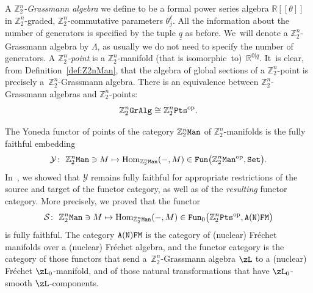 \documentclass[pdftex]{sigma}%
\newcommand{\op}[1]{\operatorname{#1}}
\newcommand{\catname}[1]{\textnormal{\texttt{#1}}}
\newcommand{\R}{{\mathbb R}}
\newcommand{\Z}{{\mathbb Z}}
\def\ul{\underline}
\def\ul{\underline}
\newcommand{\0}{\otimes}
\newcommand{\z}{\Z_2^n}
\numberwithin{equation}{section}
\begin{document}
A \emph{$\Z_2^n$-Grassmann algebra} we define to be a formal power series algebra $\R[[\theta]]$ in $\Z_2^n$-graded, $\Z_2^n$-commutative parameters $\theta_j^\ell$. All the information about the number of generators is specified by the tuple $\ul{q}$ as before. We~will denote a $\Z_2^n$-Grassmann algebra by $\Lambda$, as usually we do not need to specify the number of generators. A \emph{$\Z_2^n$-point} is a $\Z_2^n$-manifold (that is isomor\-phic~to)~$\R^{0|\ul q}$. It~is clear, from Definition~\ref{def:Z2nMan}, that the algebra of global sections of a $\Z_2^n$-point is precisely a~$\Z_2^n$-Grassmann algebra. There is an equivalence between $\Z^n_2$-Grassmann algebras and $\Z_2^n$-points:
\[
\Z_2^n\catname{GrAlg} \cong \Z_2^n\catname{Pts}^\textnormal{op}.
\]

The Yoneda functor of points of the category $\z\tt Man$ of $\z$-manifolds is the fully faithful embedding
\[
\mathcal{Y}\colon\ \z{\tt Man}\ni M\mapsto \op{Hom}_{\z{\tt Man}}(-,M)\in{\tt Fun}\big(\z{\tt Man}^{\op{op}},{\tt Set}\big).
\]
In~\cite{Bruce:2019b}, we showed that $\mathcal Y$ remains fully faithful for appropriate restrictions of the source and target of the functor category, as well as of the {\it resulting} functor category. More precisely, we proved that the functor
\[
\mathcal{S}\colon\ \z{\tt Man}\ni M\mapsto \op{Hom}_{\z{\tt Man}}(-,M)\in{\tt Fun}_0\big(\z{\tt Pts}^{\op{op}},\tt A(N)FM\big)
\]
is fully faithful. The category $\tt A(N)FM$ is the category of (nuclear) Fr\'echet manifolds over a (nuc\-lear) Fr\'echet algebra, and the functor category is the category of those functors that send a~$\z$-Grassmann algebra $\zL$ to a (nuclear) Fr\'echet $\zL_0$-manifold, and of those natural transformations that have $\zL_0$-smooth $\zL$-components.
\end{document}

